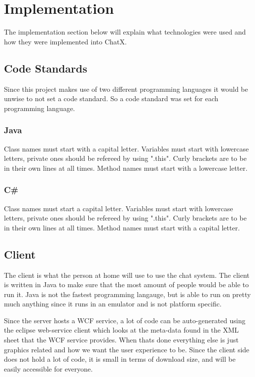 \chapter{Implementation}

The implementation section below will explain what technologies were used and how they were implemented into ChatX.

\section{Code Standards}
Since this project makes use of two different programming languages it would be unwise to not set a code standard. So a code standard was set for each programming language.

\subsection{Java}
Class names must start with a capital letter.
Variables must start with lowercase letters, private ones should be refereed by using ".this".
Curly brackets are to be in their own lines at all times.
Method names must start with a lowercase letter.


\subsection{C\#}
Class names must start a capital letter.
Variables must start with lowercase letters, private ones should be refereed by using ".this".
Curly brackets are to be in their own lines at all times.
Method names must start with a capital letter.

\section{Client}
The client is what the person at home will use to use the chat system. The client is written in Java to make sure that the most amount of people would be able to run it. Java is not the fastest programming langauge, but is able to run on pretty much anything since it runs in an emulator and is not platform specific.

Since the server hosts a WCF service, a lot of code can be auto-generated using the eclipse web-service client which looks at the meta-data found in the XML sheet that the WCF service provides. When thats done everything else is just graphics related and how we want the user experience to be. Since the client side does not hold a lot of code, it is small in terms of download size, and will be easily accessible for everyone.

